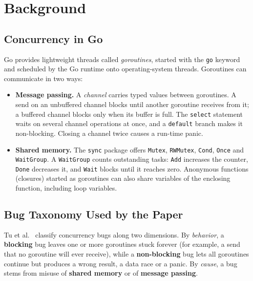 \section{Background}
\label{sec:background}

\subsection{Concurrency in Go}
Go provides lightweight threads called \emph{goroutines}, started with the
\texttt{go} keyword and scheduled by the Go runtime onto operating-system threads.
Goroutines can communicate in two ways:

\begin{itemize}
  \item \textbf{Message passing.} A \emph{channel} carries typed values between
        goroutines. A send on an unbuffered channel blocks until another goroutine
        receives from it; a buffered channel blocks only when its buffer is full.
        The \texttt{select} statement waits on several channel operations at once,
        and a \texttt{default} branch makes it non-blocking. Closing a channel twice
        causes a run-time panic.
  \item \textbf{Shared memory.} The \texttt{sync} package offers \texttt{Mutex},
        \texttt{RWMutex}, \texttt{Cond}, \texttt{Once} and \texttt{WaitGroup}.
        A \texttt{WaitGroup} counts outstanding tasks: \texttt{Add} increases the
        counter, \texttt{Done} decreases it, and \texttt{Wait} blocks until it reaches
        zero. Anonymous functions (closures) started as goroutines can also share
        variables of the enclosing function, including loop variables.
\end{itemize}

\subsection{Bug Taxonomy Used by the Paper}
Tu et al.~\cite{tu2019go} classify concurrency bugs along two dimensions.
By \emph{behavior}, a \textbf{blocking} bug leaves one or more goroutines stuck
forever (for example, a send that no goroutine will ever receive), while a
\textbf{non-blocking} bug lets all goroutines continue but produces a wrong result,
a data race or a panic. By \emph{cause}, a bug stems from misuse of
\textbf{shared memory} or of \textbf{message passing}.

